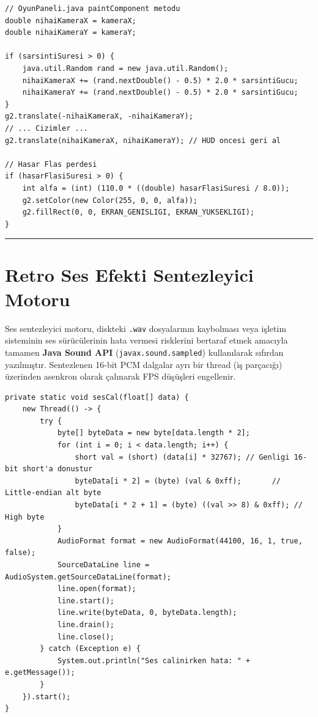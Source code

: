 \documentclass[12pt]{article}
\begin{document}
\begin{lstlisting}[caption={Kamera Sarsıntısı ve Flaş Uygulaması}, label={list:sarsinti}]
// OyunPaneli.java paintComponent metodu
double nihaiKameraX = kameraX;
double nihaiKameraY = kameraY;

if (sarsintiSuresi > 0) {
    java.util.Random rand = new java.util.Random();
    nihaiKameraX += (rand.nextDouble() - 0.5) * 2.0 * sarsintiGucu;
    nihaiKameraY += (rand.nextDouble() - 0.5) * 2.0 * sarsintiGucu;
}
g2.translate(-nihaiKameraX, -nihaiKameraY);
// ... Cizimler ...
g2.translate(nihaiKameraX, nihaiKameraY); // HUD oncesi geri al

// Hasar Flas perdesi
if (hasarFlasiSuresi > 0) {
    int alfa = (int) (110.0 * ((double) hasarFlasiSuresi / 8.0));
    g2.setColor(new Color(255, 0, 0, alfa));
    g2.fillRect(0, 0, EKRAN_GENISLIGI, EKRAN_YUKSEKLIGI);
}
\end{lstlisting}

\bigskip
\hrule
\bigskip

\section{Retro Ses Efekti Sentezleyici Motoru}

Ses sentezleyici motoru, diskteki \texttt{.wav} dosyalarının kaybolması veya işletim sisteminin ses sürücülerinin hata vermesi risklerini bertaraf etmek amacıyla tamamen \textbf{Java Sound API} (\texttt{javax.sound.sampled}) kullanılarak sıfırdan yazılmıştır. Sentezlenen 16-bit PCM dalgalar ayrı bir thread (iş parçacığı) üzerinden asenkron olarak çalınarak FPS düşüşleri engellenir.

\begin{lstlisting}[caption={Asenkron 16-bit PCM Mono Ses Çalma Modülü}, label={list:sessentezleyici}]
private static void sesCal(float[] data) {
    new Thread(() -> {
        try {
            byte[] byteData = new byte[data.length * 2];
            for (int i = 0; i < data.length; i++) {
                short val = (short) (data[i] * 32767); // Genligi 16-bit short'a donustur
                byteData[i * 2] = (byte) (val & 0xff);       // Little-endian alt byte
                byteData[i * 2 + 1] = (byte) ((val >> 8) & 0xff); // High byte
            }
            AudioFormat format = new AudioFormat(44100, 16, 1, true, false);
            SourceDataLine line = AudioSystem.getSourceDataLine(format);
            line.open(format);
            line.start();
            line.write(byteData, 0, byteData.length);
            line.drain();
            line.close();
        } catch (Exception e) {
            System.out.println("Ses calinirken hata: " + e.getMessage());
        }
    }).start();
}
\end{lstlisting}
\end{document}

